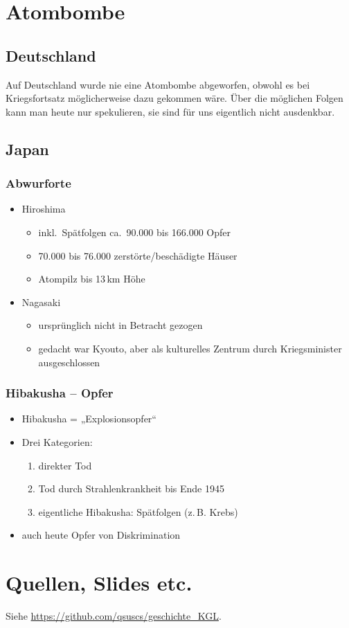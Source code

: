 \documentclass{scrartcl}
\begin{document}
\section{Atombombe}
\subsection{Deutschland}
Auf Deutschland wurde nie eine Atombombe abgeworfen, obwohl es bei
Kriegsfortsatz möglicherweise dazu gekommen wäre.  Über die möglichen Folgen
kann man heute nur spekulieren, sie sind für uns eigentlich nicht ausdenkbar.

\subsection{Japan}
\subsubsection{Abwurforte}
\begin{itemize}
	\item Hiroshima
		\begin{itemize}
			\item inkl.\ Spätfolgen ca.\ 90.000 bis 166.000 Opfer
			\item 70.000 bis 76.000 zerstörte/beschädigte Häuser
			\item Atompilz bis 13\,km Höhe
		\end{itemize}
	\item Nagasaki
		\begin{itemize}
			\item ursprünglich nicht in Betracht gezogen
			\item gedacht war Kyouto, aber als kulturelles Zentrum durch
				Kriegsminister ausgeschlossen
		\end{itemize}
\end{itemize}

\subsubsection{Hibakusha -- Opfer}
\begin{itemize}
	\item Hibakusha = „Explosionsopfer“
	\item Drei Kategorien:
		\begin{enumerate}
			\item direkter Tod
			\item Tod durch Strahlenkrankheit bis Ende 1945
			\item eigentliche Hibakusha: Spätfolgen (z.\,B. Krebs)
		\end{enumerate}
	\item auch heute Opfer von Diskrimination
\end{itemize}

\section{Quellen, Slides etc.}
Siehe \url{https://github.com/qsuscs/geschichte_KGL}.
\end{document}
